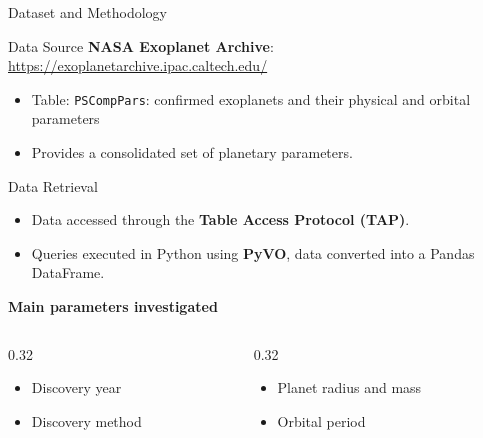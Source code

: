 \documentclass[aspectratio=169,11pt]{beamer}
\begin{document}
	\begin{frame}{Dataset and Methodology}
	
	\begin{block}{Data Source}
		\textbf{NASA Exoplanet Archive}: \href{https://exoplanetarchive.ipac.caltech.edu/}{https://exoplanetarchive.ipac.caltech.edu/}
		
		\begin{itemize}
			\item Table: \texttt{PSCompPars}: confirmed exoplanets and their physical
			and orbital parameters
			
			\item Provides a consolidated set of planetary parameters.
		\end{itemize}
	\end{block}
	
	\vspace{0.2cm}
	
	\begin{block}{Data Retrieval}
		\begin{itemize}
			\item Data accessed through the
			\textbf{Table Access Protocol (TAP)}.
			\item Queries executed in Python using
			\textbf{PyVO}, data converted into a Pandas DataFrame.
			
		\end{itemize}
	\end{block}
	
	\vspace{0.2cm}
	
	\textbf{Main parameters investigated}

	\vspace{0.1cm}

	\begin{columns}[T,onlytextwidth]
	
		\begin{column}{0.32\textwidth}
			\begin{itemize}
				\setlength{\itemsep}{2pt}
				\item Discovery year
				\item Discovery method
			\end{itemize}
		\end{column}
	
		\begin{column}{0.32\textwidth}
			\begin{itemize}
			\setlength{\itemsep}{2pt}
			\item Planet radius and mass
			\item Orbital period
			\end{itemize}
		\end{column}
	

\end{columns}
\end{frame}
\end{document}
